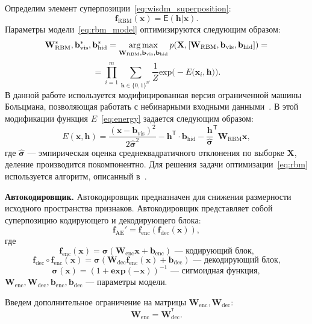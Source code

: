Определим элемент суперпозиции~\eqref{eq:wisdm_superposition}: 
\begin{equation}
\label{eq:rbm_model}
\mathbf{f}_\text{RBM}(\mathbf{x}) = \mathsf{E}(\mathbf{h}|\mathbf{x}).
\end{equation}
Параметры модели~\eqref{eq:rbm_model} оптимизируются следующим образом:
\begin{equation}
\label{eq:rbm}
{\mathbf{W}}^{*}_\text{RBM},{\mathbf{b}}^{*}_\text{vis}, {\mathbf{b}}^{*}_\text{hid} = \operatorname*{arg\,max}_{{\mathbf{W}_\text{RBM}},{\mathbf{b}}_\text{vis}, {\mathbf{b}}_\text{hid} } p(\mathbf{X}, [{\mathbf{W}_\text{RBM}},{\mathbf{b}}_\text{vis}, {\mathbf{b}}_\text{hid}]) =
\end{equation}
\[
= \prod_{i=1}^m \sum_{\mathbf{h}\in \{0,1\}^{n'}} \frac{1}{Z} \text{exp}\bigl(-E(\mathbf{\mathbf{x}}_i,\mathbf{h)}\bigr).
\]
В данной работе используется модифицированная версия ограниченной машины Больцмана, позволяющая работать с небинарными входными данными~\cite{gbrbm}. В этой модификации функция $E$~\eqref{eq:energy} задается следующим образом:
\[
E(\mathbf{x},\mathbf{h}) = \frac{(\mathbf{x} - \mathbf{b}_\text{vis})^2}{2\hat{\boldsymbol{\sigma}}^2} -\mathbf{h}^\mathsf{T} \cdot \mathbf{b}_\text{hid} - \frac{\mathbf{h}}{\hat{\boldsymbol{\sigma}}}^\mathsf{T}\mathbf{W}_\text{RBM}\mathbf{x},
\]
где $\hat{\boldsymbol{\sigma}}$ --- эмпирическая оценка среднеквадратичного отклонения по выборке $\mathbf{X}$, деление производится покомпонентно. 
Для решения задачи оптимизации~\eqref{eq:rbm} используется алгоритм, описанный в~\cite{hinton_rbm}.

\textbf{Автокодировщик.}
Автокодировщик предназначен для снижения размерности исходного пространства признаков.
Автокодировщик представляет собой суперпозицию кодирующего и декодирующего блока:
\[
 \mathbf{f}_\text{AE}' = \mathbf{f}_\text{enc}(\mathbf{f}_\text{dec}(\mathbf{x})),
\]
где $$ \mathbf{f}_\text{enc}(\mathbf{x}) = \boldsymbol{\sigma}(\mathbf{W}_\text{enc}\mathbf{x}+\mathbf{b}_\text{enc}) \text{ --- кодирующий блок,}$$
$$  \mathbf{f}_\text{dec} \circ \mathbf{f}_\text{enc}(\mathbf{x}) = \boldsymbol{\sigma}(\mathbf{W}_\text{dec}\mathbf{f}_\text{enc}(\mathbf{x})+\mathbf{b}_\text{dec})\text{ --- декодирующий блок,}$$ $$\boldsymbol{\sigma}(\mathbf{x}) = (1+\textbf{exp}({-\mathbf{x}}))^{-1} \text{ --- сигмоидная функция},$$ $\mathbf{W}_\text{enc},\mathbf{W}_\text{dec},\mathbf{b}_\text{enc}, \mathbf{b}_\text{dec}$ --- параметры модели.

Введем дополнительное ограничение на матрицы $\mathbf{W}_\text{enc}, \mathbf{W}_\text{dec}$:
\[
 \mathbf{W}_\text{enc} = \mathbf{W}_\text{dec}^{^\mathsf{T}}.
\]

